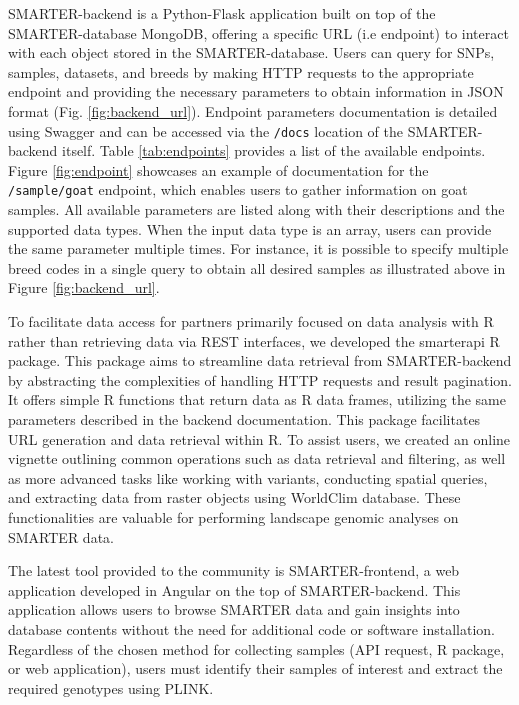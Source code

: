 \documentclass[a4paper,num-refs,gigabyte]{oup-contemporary}
\begin{document}
SMARTER-backend is a Python-Flask application built on top of the SMARTER-database MongoDB, offering a specific URL (i.e endpoint) to interact with each object stored in the SMARTER-database. Users can query for SNPs, samples, datasets, and breeds by making HTTP requests to the appropriate endpoint and providing the necessary parameters to obtain information in JSON format (Fig. \ref{fig:backend_url}).
Endpoint parameters documentation is detailed using Swagger and can be accessed via the \texttt{/docs} location of the SMARTER-backend itself. Table \ref{tab:endpoints} provides a list of the available endpoints.
Figure \ref{fig:endpoint} showcases an example of documentation for the \texttt{/sample/goat} endpoint, which enables users to gather information on goat samples. All available parameters are listed along with their descriptions and the supported data types. When the input data type is an array, users can provide the same parameter multiple times. For instance, it is possible to specify multiple breed codes in a single query to obtain all desired samples as illustrated above in Figure \ref{fig:backend_url}.

To facilitate data access for partners primarily focused on data analysis with R rather than retrieving data via REST interfaces, we developed the smarterapi R package\citep{RSMARTERAPI}. This package aims to streamline data retrieval from SMARTER-backend by abstracting the complexities of handling HTTP requests and result pagination. It offers simple R functions that return data as R data frames, utilizing the same parameters described in the backend documentation. This package facilitates URL generation and data retrieval within R.
To assist users, we created an online vignette outlining common operations such as data retrieval and filtering, as well as more advanced tasks like working with variants, conducting spatial queries, and extracting data from raster objects using WorldClim database\citep{Fick2017}. These functionalities are valuable for performing landscape genomic analyses on SMARTER data.

The latest tool provided to the community is SMARTER-frontend\citep{SMARTERfrontend}, a web application developed in Angular\citep{Angular} on the top of SMARTER-backend. This application allows users to browse SMARTER data and gain insights into database contents without the need for additional code or software installation. Regardless of the chosen method for collecting samples (API request, R package, or web application), users must identify their samples of interest and extract the required genotypes using PLINK.
\end{document}
